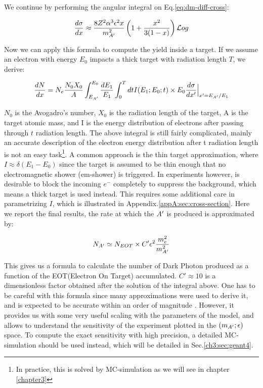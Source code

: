 We continue by performing the angular integral on Eq.\ref{eq:dm-diff-cross}:

\begin{equation}
  \label{eq:dm-diff-cross-int}
  \frac{d\sigma}{dx} \approx \frac{8 Z^2 \alpha^3 \epsilon^2 x}{m^2_{A'}} \left( 1 + \frac{x^2}{3(1-x)} \right) \mathcal{L}og 
\end{equation}

Now we can apply this formula to compute the yield inside a target. If we assume an electron with energy $E_0$ impacts a thick target with radiation length $T$, we derive:

\begin{equation}
  \label{eq:dm-general-yield}
  \frac{dN}{dx} = N_e \frac{N_0 X_0}{A} \int_{E_{A'}}^{E_0} \frac{dE_1}{E_1} \int_0^T dt I(E_1;E_0;t) \times E_0 \frac{d\sigma}{dx'}\Big|_{x' = E_{A'}/E_1}
\end{equation}

$N_0$ is the Avogadro's number, $X_0$ is the radiation length of the target, A is the target atomic mass, and I is the energy distribution of electrons after passing through $t$ radiation length. The above integral is still fairly complicated, mainly an accurate description of the electron energy distribution after t radiation length is not an easy task\footnote{In practice, this is solved by MC-simulation as we will see in chapter \ref{chapter3}}. A common approach is the thin target approximation, where $I \approx \delta (E_1 - E_0)$ since the target is assumed to be thin enough that no electromagnetic shower (em-shower) is triggered. In experiments however, is desirable to block the incoming $e^-$ completely to suppress the background, which means a thick target is used instead. This requires some additional care in parametrizing $I$, which is illustrated in Appendix.\ref{appA:sec:cross-section}. Here we report the final results, the rate at which the $A'$ is produced is approximated by:

\begin{equation}
  \label{eq:dm-rate}
  N_{A'} \simeq N_{EOT} \times C' \epsilon^2 \frac{m_e^2}{m^2_{A'}}
\end{equation}

This gives us a formula to calculate the number of Dark Photon produced as a function of the EOT(Electron On Target) accumulated. $C' \approx 10$ is a dimensionless factor obtained after the solution of the integral above. One has to be careful with this formula since many approximations were used to derive it, and is expected to be accurate within an order of magnitude \cite{jdb}. However, it provides us with some very useful scaling with the parameters of the model, and allows to understand the sensitivity of the experiment plotted in the $(m_{A'};\epsilon)$ space. To compute the exact sensitivity with high precision, a detailed MC-simulation should be used instead, which will be detailed in Sec.\ref{ch3:sec:geant4}.

